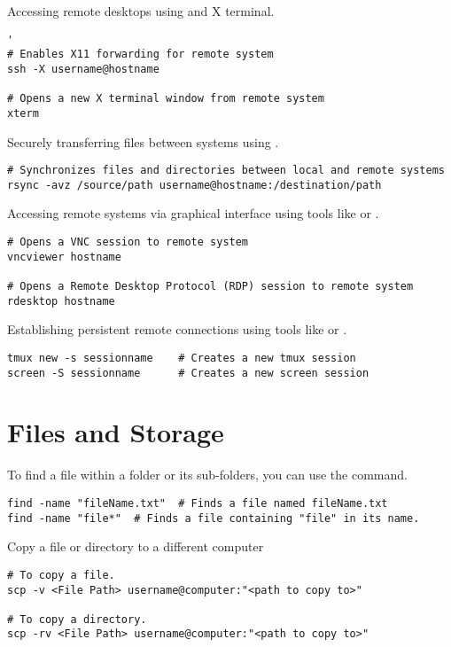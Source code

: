 Accessing remote desktops using  and X terminal.
\begin{lstlisting}'
# Enables X11 forwarding for remote system
ssh -X username@hostname

# Opens a new X terminal window from remote system
xterm        
\end{lstlisting}

Securely transferring files between systems using .
\begin{lstlisting}
# Synchronizes files and directories between local and remote systems
rsync -avz /source/path username@hostname:/destination/path
\end{lstlisting}

Accessing remote systems via graphical interface using tools like  or .
\begin{lstlisting}
# Opens a VNC session to remote system
vncviewer hostname

# Opens a Remote Desktop Protocol (RDP) session to remote system
rdesktop hostname
\end{lstlisting}

Establishing persistent remote connections using tools like  or .
\begin{lstlisting}
tmux new -s sessionname    # Creates a new tmux session
screen -S sessionname      # Creates a new screen session
\end{lstlisting}








\section{Files and Storage}

To find a file within a folder or its sub-folders, you can use the  command.
\begin{lstlisting}
find -name "fileName.txt"  # Finds a file named fileName.txt
find -name "file*"  # Finds a file containing "file" in its name.
\end{lstlisting}

Copy a file or directory to a different computer
\begin{lstlisting}
# To copy a file.
scp -v <File Path> username@computer:"<path to copy to>"

# To copy a directory.
scp -rv <File Path> username@computer:"<path to copy to>"
\end{lstlisting}


